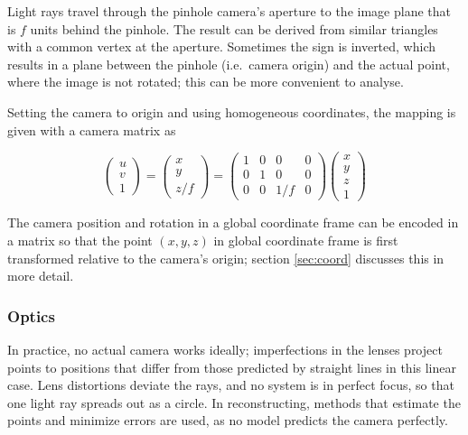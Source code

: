 Light rays travel through the pinhole camera's aperture to the image plane that is $f$ units behind the pinhole.
The result can be derived from similar triangles with a common vertex at the aperture.
Sometimes the sign is inverted, which results in a plane between the pinhole (i.e.~camera origin) and the actual point, where the image is not rotated; this can be more convenient to analyse.
\cite{hartley03multiview}

Setting the camera to origin and using homogeneous coordinates, the mapping is given with a camera matrix as

\begin{equation}
\begin{pmatrix}
u \\ v \\ 1
\end{pmatrix}
=
\begin{pmatrix}
x \\ y \\ z/f
\end{pmatrix}
=
\begin{pmatrix} \label{eq:cmat}
	1 & 0 & 0 & 0 \\
	0 & 1 & 0 & 0 \\
	0 & 0 & 1/f & 0
\end{pmatrix}
\begin{pmatrix}
x \\ y \\ z \\ 1
\end{pmatrix}
\end{equation}

The camera position and rotation in a global coordinate frame can be encoded in a matrix so that the point $(x,y,z)$ in global coordinate frame is first transformed relative to the camera's origin; section \ref{sec:coord} discusses this in more detail.


\subsubsection{Optics} %

In practice, no actual camera works ideally; imperfections in the lenses project points to positions that differ from those predicted by straight lines in this linear case.
Lens distortions deviate the rays, and no system is in perfect focus, so that one light ray spreads out as a circle.
In reconstructing, methods that estimate the points and minimize errors are used, as no model predicts the camera perfectly.

